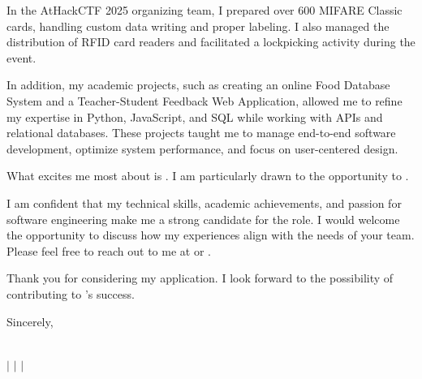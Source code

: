 \documentclass[10pt]{article}
\begin{document}
In the AtHackCTF 2025 organizing team, I prepared over 600 MIFARE Classic cards, handling custom data writing and proper labeling. I also managed the distribution of RFID card readers and facilitated a lockpicking activity during the event.

In addition, my academic projects, such as creating an online Food Database System and a Teacher-Student Feedback Web Application, allowed me to refine my expertise in Python, JavaScript, and SQL while working with APIs and relational databases. These projects taught me to manage end-to-end software development, optimize system performance, and focus on user-centered design.

What excites me most about \company \space is \companyDetails. I am particularly drawn to the opportunity to \positionDetails.

I am confident that my technical skills, academic achievements, and passion for software engineering make me a strong candidate for the \position \space role. I would welcome the opportunity to discuss how my experiences align with the needs of your team. Please feel free to reach out to me at \href{tel:+15149445977}{\phone} or \href{mailto:\email}{\email}.

\vspace{1.5em}
Thank you for considering my application. I look forward to the possibility of contributing to \company's success.

\vspace{2em}
Sincerely, \\
\fullname

\newpage


\begin{center}
    {\Huge \textbf{\fullname}} \\
    \vspace{1mm}
    {\small 
    \faPhone \hspace{0mm} \href{tel:+15149445977}{\phone} $\vert$ 
    \faEnvelope \hspace{0mm} \href{mailto:massimo02caruso@gmail.com}{\email} $\vert$ 
    \faLinkedin \hspace{0mm} \href{https://linkedin.com/in/massimocaruso}{\linkedin} $\vert$ 
    \faGithub \hspace{0mm} \href{https://github.com/Extinctable}{\github}
    }
\end{center}

\vspace{-8mm}
\end{document}
